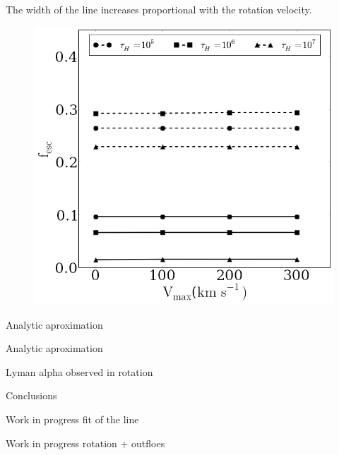 \documentclass{beamer}
\begin{document}
\begin{frame}{The width of the line increases proportional with the rotation velocity.}
\begin{figure}
\includegraphics[scale=0.16]{Figures/f10.png}
\end{figure}
\end{frame}

\begin{frame}{Analytic aproximation}

\end{frame}

\begin{frame}{Analytic aproximation}

\end{frame}{Lyman alpha observed in rotation}

\begin{frame}

\end{frame}

\begin{frame}{Conclusions}
\end{frame}

\begin{frame}{Work in progress}
fit of the line
\end{frame}

\begin{frame}{Work in progress}
rotation + outfloes
\end{frame}
\end{document}
